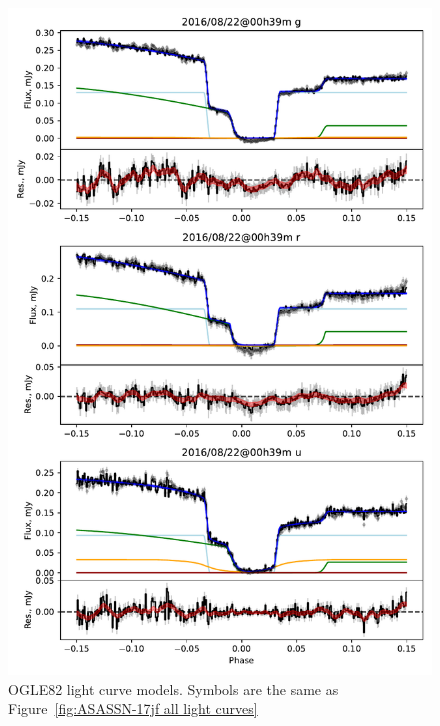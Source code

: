 \begin{figure}
    \centering
    \includegraphics[width=\textwidth]{figures/results/OGLE82/OGLE82_1.pdf}
    \caption{OGLE82 light curve models. Symbols are the same as Figure~\ref{fig:ASASSN-17jf all light curves}}
    \label{fig:OGLE82 all light curves}
\end{figure}
